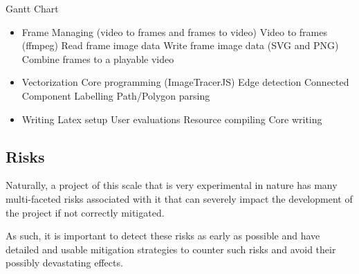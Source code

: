 \documentclass[12pt]{article}
\newcommand{\sentence}{} %
\begin{document}
    \pagebreak
    \thispagestyle{empty}
    \begin{landscape}
        \begin{center}
            \huge{Gantt Chart}
            \normalsize
            \begin{itemize}
                \item Frame Managing (video to frames and frames to video)
                \subitem Video to frames (ffmpeg)
                \subitem Read frame image data
                \subitem Write frame image data (SVG and PNG)
                \subitem Combine frames to a playable video
                \item Vectorization
                \subitem Core programming (ImageTracerJS)
                \subitem Edge detection
                \subitem Connected Component Labelling
                \subitem Path/Polygon parsing
                \item Writing
                \subitem Latex setup
                \subitem User evaluations
                \subitem Resource compiling
                \subitem Core writing
            \end{itemize}
        \end{center}
    \end{landscape}
    \pagebreak


    \pagebreak

    \subsection{Risks}\label{subsec:risks}

    \tab
    Naturally, a project of this scale that is very experimental in nature has many multi-faceted risks
    associated with it that can severely impact the development of the project if not correctly mitigated.
    \sentence
    As such, it is important to detect these risks as early as possible and have detailed and usable mitigation
    strategies to counter such risks and avoid their possibly devastating effects.
    \sentence
\end{document}
